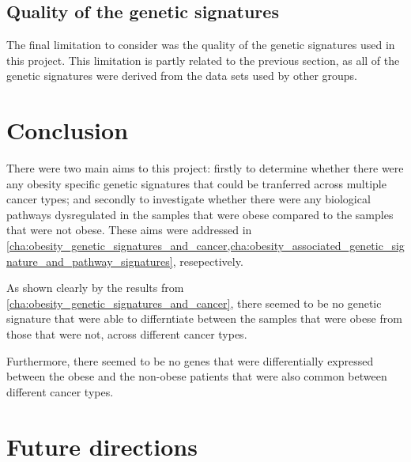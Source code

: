 

\subsection{Quality of the genetic signatures}
\label{sub:quality_of_the_genetic_signatures}

The final limitation to consider was the quality of the genetic signatures used in this project.
This limitation is partly related to the previous section, as all of the genetic signatures were derived from the data sets used by other groups.







\section{Conclusion}
\label{sec:conclusion}

There were two main aims to this project: firstly to determine whether there were any obesity specific genetic signatures that could be tranferred across multiple cancer types; and secondly to investigate whether there were any biological pathways dysregulated in the samples that were obese compared to the samples that were not obese.
These aims were addressed in \cref{cha:obesity_genetic_signatures_and_cancer,cha:obesity_associated_genetic_signature_and_pathway_signatures}, resepectively.

As shown clearly by the results from \cref{cha:obesity_genetic_signatures_and_cancer}, there seemed to be no  genetic signature that were able to differntiate between the samples that were obese from those that were not, across different cancer types.

Furthermore, there seemed to be no genes that were differentially expressed between the obese and the non-obese patients that were also common between different cancer types.





\section{Future directions}
\label{sec:future_directions}














